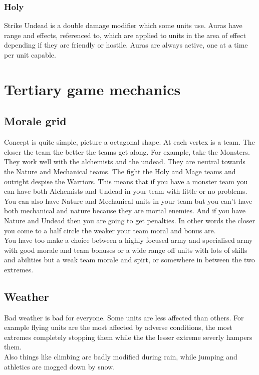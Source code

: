 \documentclass[a4paper]{article}
\begin{document}
\subsubsection{Holy}
Strike Undead is a double damage modifier which some units use.
Auras have range and effects, referenced to, which are applied to units in the area of effect depending if they are friendly or hostile. Auras are always active, one at a time per unit capable.

\newpage \section{Tertiary game mechanics}

\subsection{Morale grid}

Concept is quite simple, picture a octagonal shape. At each vertex is a team. The closer the team the better the teams get along. For example, take the Monsters. They work well with the alchemists and the undead. They are neutral towards the Nature and Mechanical teams. The fight the Holy and Mage teams and outright despise the Warriors. This means that if you have a monster team you can have both Alchemists and Undead in your team with little or no problems.\\
You can also have Nature and Mechanical units in your team but you can't have both mechanical and nature because they are mortal enemies. And if you have Nature and Undead then you are going to get penalties. In other words the closer you come to a half circle the weaker your team moral and bonus are.\\
You have too make a choice between a highly focused army and specialised army with good morale and team bonuses or a wide range off units with lots of skills and abilities but a weak team morale and spirt, or somewhere in between the two extremes.

\subsection{Weather}

Bad weather is bad for everyone. Some units are less affected than others. For example flying units are the most affected by adverse conditions, the most extremes completely stopping them while the the lesser extreme severly hampers them.\\
Also things like climbing are badly modified during rain, while jumping and athletics are mogged down by snow.\\
\end{document}
